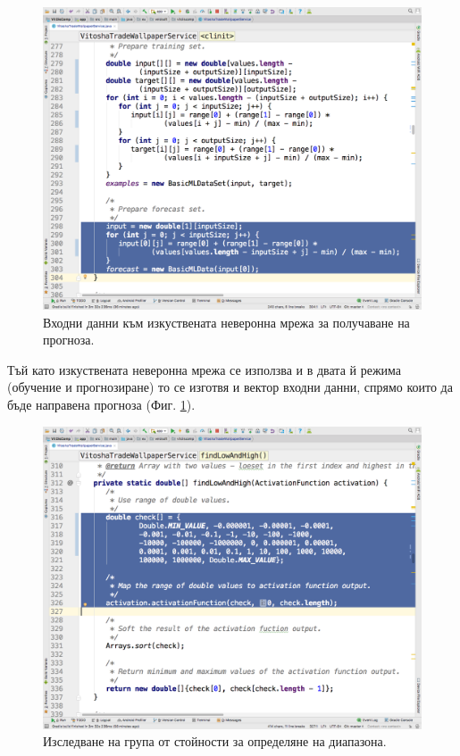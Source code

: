 \documentclass[book,14pt,oneside,openany]{memoir}
\begin{document}
\begin{figure}[h]
  \centering
  \includegraphics[height=0.45\pdfpageheight]{pic0042}
  \caption{Входни данни към изкуствената неверонна мрежа за получаване на прогноза.}
\label{fig:pic0042}
\end{figure}
\FloatBarrier

Тъй като изкуствената неверонна мрежа се използва и в двата й режима (обучение и прогнозиране) то се изготвя и вектор входни данни, спрямо които да бъде направена прогноза (Фиг. \ref{fig:pic0042}).

\begin{figure}[h]
  \centering
  \includegraphics[height=0.45\pdfpageheight]{pic0043}
  \caption{Изследване на група от стойности за определяне на диапазона.}
\label{fig:pic0043}
\end{figure}
\FloatBarrier
\end{document}
